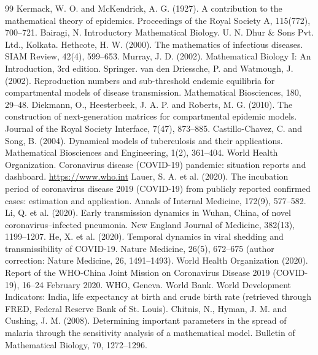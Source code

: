 \documentclass[12pt,a4paper]{article}
\theoremstyle{definition}
\begin{document}
\begin{thebibliography}{99}
 Kermack, W. O. and McKendrick, A. G. (1927). A contribution to the mathematical theory of epidemics. Proceedings of the Royal Society A, 115(772), 700–721.
 Bairagi, N. Introductory Mathematical Biology. U. N. Dhur \& Sons Pvt. Ltd., Kolkata.
 Hethcote, H. W. (2000). The mathematics of infectious diseases. SIAM Review, 42(4), 599–653.
 Murray, J. D. (2002). Mathematical Biology I: An Introduction, 3rd edition. Springer.
 van den Driessche, P. and Watmough, J. (2002). Reproduction numbers and sub-threshold endemic equilibria for compartmental models of disease transmission. Mathematical Biosciences, 180, 29–48.
 Diekmann, O., Heesterbeek, J. A. P. and Roberts, M. G. (2010). The construction of next-generation matrices for compartmental epidemic models. Journal of the Royal Society Interface, 7(47), 873–885.
 Castillo-Chavez, C. and Song, B. (2004). Dynamical models of tuberculosis and their applications. Mathematical Biosciences and Engineering, 1(2), 361–404.
 World Health Organization. Coronavirus disease (COVID-19) pandemic: situation reports and dashboard. \url{https://www.who.int}
 Lauer, S. A. et al. (2020). The incubation period of coronavirus disease 2019 (COVID-19) from publicly reported confirmed cases: estimation and application. Annals of Internal Medicine, 172(9), 577–582.
 Li, Q. et al. (2020). Early transmission dynamics in Wuhan, China, of novel coronavirus–infected pneumonia. New England Journal of Medicine, 382(13), 1199–1207.
 He, X. et al. (2020). Temporal dynamics in viral shedding and transmissibility of COVID-19. Nature Medicine, 26(5), 672–675 (author correction: Nature Medicine, 26, 1491–1493).
 World Health Organization (2020). Report of the WHO-China Joint Mission on Coronavirus Disease 2019 (COVID-19), 16–24 February 2020. WHO, Geneva.
 World Bank. World Development Indicators: India, life expectancy at birth and crude birth rate (retrieved through FRED, Federal Reserve Bank of St. Louis).
 Chitnis, N., Hyman, J. M. and Cushing, J. M. (2008). Determining important parameters in the spread of malaria through the sensitivity analysis of a mathematical model. Bulletin of Mathematical Biology, 70, 1272–1296.
\end{thebibliography}

\clearpage
\appendix
\end{document}
